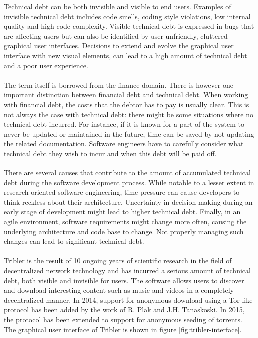 Technical debt can be both invisible and visible to end users\cite{kruchten2012technical}.
Examples of invisible technical debt includes code smells, coding style violations, low internal quality and high code complexity.
Visible technical debt is expressed in bugs that are affecting users but can also be identified by user-unfriendly, cluttered graphical user interfaces.
Decisions to extend and evolve the graphical user interface with new visual elements, can lead to a high amount of technical debt and a poor user experience.\\\\
The term itself is borrowed from the finance domain\cite{guo2011portfolio}.
There is however one important distinction between financial debt and technical debt.
When working with financial debt, the costs that the debtor has to pay is usually clear.
This is not always the case with technical debt: there might be some situations where no technical debt incurred.
For instance, if it is known for a part of the system to never be updated or maintained in the future, time can be saved by not updating the related documentation.
Software engineers have to carefully consider what technical debt they wish to incur and when this debt will be paid off.\\\\
There are several causes that contribute to the amount of accumulated technical debt during the software development process\cite{martini2014architecture}. While notable to a lesser extent in research-oriented software engineering, time pressure can cause developers to think reckless about their architecture. Uncertainty in  decision making during an early stage of development might lead to higher technical debt. Finally, in an agile environment, software requirements might change more often, causing the underlying architecture and code base to change. Not properly managing such changes can lead to significant technical debt.\\\\
Tribler is the result of 10 ongoing years of scientific research in the field of decentralized network technology and has incurred a serious amount of technical debt, both visible and invisible for users.
The software allows users to discover and download interesting content such as music and videos in a completely decentralized manner.
In 2014, support for anonymous download using a Tor-like protocol has been added by the work of R. Plak\cite{plak2014anonymous} and J.H. Tanaskoski\cite{tanaskoski2014anonymous}. 
In 2015, the protocol has been extended to support for anonymous seeding of torrents\cite{ruigrok2015bittorrent}.
The graphical user interface of Tribler is shown in figure \ref{fig:tribler-interface}.

